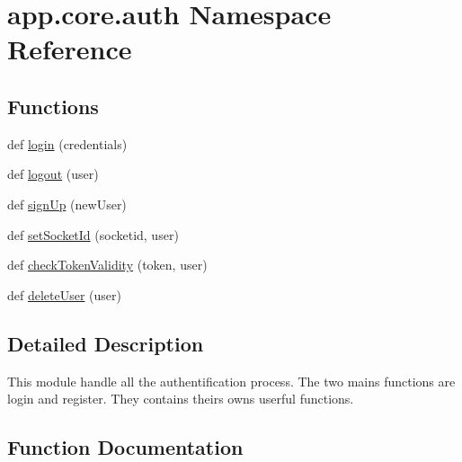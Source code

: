 \hypertarget{namespaceapp_1_1core_1_1auth}{}\section{app.\+core.\+auth Namespace Reference}
\label{namespaceapp_1_1core_1_1auth}
\subsection*{Functions}
\begin{DoxyCompactItemize}
\item 
def \hyperlink{namespaceapp_1_1core_1_1auth_aa8cecbd33848dc04dbe5de74e5529124}{login} (credentials)
\item 
def \hyperlink{namespaceapp_1_1core_1_1auth_ae87863230b51e980badace5e2df98f9b}{logout} (user)
\item 
def \hyperlink{namespaceapp_1_1core_1_1auth_af8454a99dba50fcce1fc955a492871b8}{sign\+Up} (new\+User)
\item 
def \hyperlink{namespaceapp_1_1core_1_1auth_a218d3eabbf4a3f1be7f409dfd2bd2be4}{set\+Socket\+Id} (socketid, user)
\item 
def \hyperlink{namespaceapp_1_1core_1_1auth_a3ff0f7317cdc16d6782fab96b4a6311f}{check\+Token\+Validity} (token, user)
\item 
def \hyperlink{namespaceapp_1_1core_1_1auth_a06afba77de9ef8e1b6495e833678d1a4}{delete\+User} (user)
\end{DoxyCompactItemize}


\subsection{Detailed Description}
\begin{DoxyVerb}This module handle all the authentification process.
The two mains functions are login and register. They contains theirs owns userful functions.
\end{DoxyVerb}
 

\subsection{Function Documentation}
\mbox{\label{namespaceapp_1_1core_1_1auth_a3ff0f7317cdc16d6782fab96b4a6311f}} 
